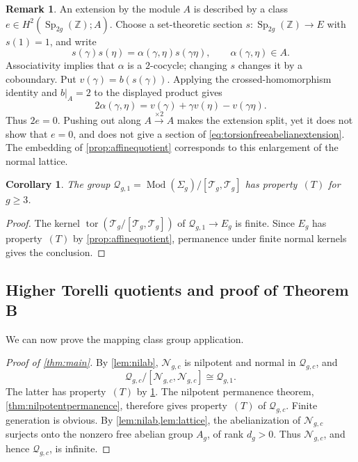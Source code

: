 \documentclass[11pt,a4paper]{article}
\newtheorem{corollary}[theorem]{Corollary}
\theoremstyle{definition}
\newtheorem{remark}[theorem]{Remark}
\newcommand{\Z}{\mathbb Z}
\newcommand{\Mod}{\operatorname{Mod}}
\newcommand{\Sp}{\operatorname{Sp}}
\newcommand{\tor}{\operatorname{tor}}
\newcommand{\rt}{(T)}
\begin{document}
\begin{remark}
An extension by the module \(A\) is described by a class
\(e\in H^2(\Sp_{2g}(\Z);A)\). Choose a set-theoretic
section \(s:\Sp_{2g}(\Z)\to E\) with \(s(1)=1\), and write
\[
 s(\gamma)s(\eta)=\alpha(\gamma,\eta)s(\gamma\eta),
 \qquad \alpha(\gamma,\eta)\in A.
\]
Associativity implies that \(\alpha\) is a \(2\)-cocycle;
changing \(s\) changes it by a coboundary. Put
\(v(\gamma)=b(s(\gamma))\). Applying the crossed-homomorphism
identity and \(b|_A=2\) to the displayed product gives
\[
 2\alpha(\gamma,\eta)
 =v(\gamma)+\gamma v(\eta)-v(\gamma\eta).
\]
Thus \(2e=0\). Pushing out along \(A\xrightarrow{\times2}A\)
makes the extension split, yet it does not show that \(e=0\), and
does not give a section of \eqref{eq:torsionfreeabelianextension}.
The embedding of \cref{prop:affinequotient} corresponds to this
enlargement of the normal lattice.
\end{remark}

\begin{corollary}\label{cor:firststage}
The group \(\mathcal{Q}_{g,1}=\Mod(\Sigma_g)/[\mathcal{T}_g,\mathcal{T}_g]\) has property~\(\rt\)
for \(g\ge3\).
\end{corollary}
\begin{proof}
The kernel \(\tor(\mathcal{T}_g/[\mathcal{T}_g,\mathcal{T}_g])\) of \(\mathcal{Q}_{g,1}\to E_g\) is finite.
Since \(E_g\) has property~\(\rt\) by \cref{prop:affinequotient},
permanence under finite normal kernels gives the conclusion.
\end{proof}


\subsection{Higher Torelli quotients and proof of Theorem B}

We can now prove the mapping class group application.

\begin{proof}[Proof of \cref{thm:main}]
By \cref{lem:nilab}, \(\mathcal{N}_{g,c}\) is nilpotent and normal
in \(\mathcal{Q}_{g,c}\), and
\[
 \mathcal{Q}_{g,c}/[\mathcal{N}_{g,c},\mathcal{N}_{g,c}]
 \cong \mathcal{Q}_{g,1}.
\]
The latter has property~\(\rt\) by \cref{cor:firststage}.
The nilpotent permanence theorem, \cref{thm:nilpotentpermanence},
therefore gives property~\(\rt\) of \(\mathcal{Q}_{g,c}\).
Finite generation is obvious.
By \cref{lem:nilab,lem:lattice}, the abelianization of \(\mathcal{N}_{g,c}\)
surjects onto the nonzero free abelian group \(A_g\), of rank
\(d_g>0\). Thus \(\mathcal{N}_{g,c}\), and hence \(\mathcal{Q}_{g,c}\), is infinite.
\end{proof}
\end{document}
